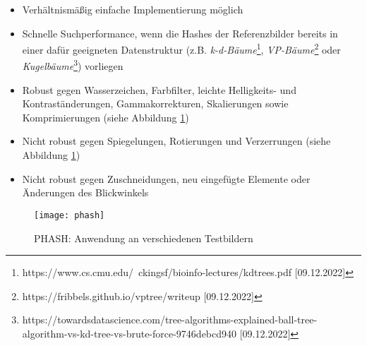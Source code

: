 \begin{itemize}[topsep=0pt]
    \item Verhältnismäßig einfache Implementierung möglich
    \item Schnelle Suchperformance, wenn die Hashes der Referenzbilder bereits
    in einer dafür geeigneten Datenstruktur (z.B. \textit{k-d-Bäume}\footnote{https://www.cs.cmu.edu/~ckingsf/bioinfo-lectures/kdtrees.pdf [09.12.2022]},
    \textit{VP-Bäume}\footnote{https://fribbels.github.io/vptree/writeup [09.12.2022]}
    oder \textit{Kugelbäume}\footnote{https://towardsdatascience.com/tree-algorithms-explained-ball-tree-algorithm-vs-kd-tree-vs-brute-force-9746debcd940 [09.12.2022]})
    vorliegen \parencite{hashing-lvngd}
    \item Robust gegen Wasserzeichen, Farbfilter, leichte Helligkeits- und
    Kontraständerungen, Gammakorrekturen, Skalierungen sowie Komprimierungen
    (siehe Abbildung \ref{fig:phash})
    \parencite{hashing-phash}
\end{itemize}

\begin{itemize}[topsep=0pt]
    \item Nicht robust gegen Spiegelungen, Rotierungen und Verzerrungen (siehe
    Abbildung \ref{fig:phash})
    \item Nicht robust gegen Zuschneidungen, neu eingefügte Elemente oder
    Änderungen des Blickwinkels
\end{itemize}

\begin{figure}[H]
    \centering
    \texttt{[image: phash]}
    \caption{PHASH: Anwendung an verschiedenen Testbildern}
    \label{fig:phash}
\end{figure}